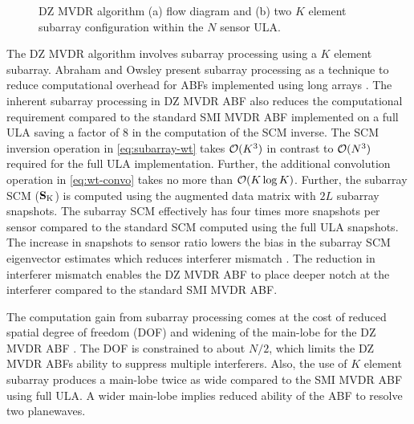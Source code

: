 \begin{figure}[!ht]
  \centering

  \vfil


  \caption{DZ MVDR algorithm (a) flow diagram and (b) two $K$ element
    subarray configuration within the $N$ sensor ULA.}
  \label{fig:dzmvdr}
\end{figure}

The DZ MVDR algorithm involves subarray processing using a $K$ element
subarray. Abraham and Owsley present subarray processing as a
technique to reduce computational overhead for ABFs implemented using
long arrays \cite{abraham89preproc}. The inherent subarray processing
in DZ MVDR ABF also reduces the computational requirement compared to the
standard SMI MVDR ABF implemented on a full ULA saving a factor of 8
in the computation of the SCM inverse. The SCM inversion operation in
\eqref{eq:subarray-wt} takes $\mathcal{O}(K^3)$ in contrast to $\mathcal{O}(N^3)$
required for the full ULA implementation. Further, the additional
convolution operation in \eqref{eq:wt-convo} takes no more than
$\mathcal{O}(K \operatorname{log} K)$. Further, the subarray SCM
(${\bf S}_{\rm K}$) is computed using the augmented data matrix with
$2L$ subarray snapshots. The subarray SCM effectively has four times
more snapshots per sensor compared to the standard SCM computed using
the full ULA snapshots. The increase in snapshots to sensor ratio
lowers the bias in the subarray SCM eigenvector estimates which reduces
interferer mismatch \cite{benaych2011eigen, paul2007asymptotics}. The reduction in interferer mismatch enables the DZ MVDR ABF to place deeper notch at the interferer compared to the standard SMI MVDR ABF. 

The computation gain from subarray processing comes at the cost of
reduced spatial degree of freedom (DOF) and widening of the main-lobe
for the DZ MVDR ABF \cite{abraham89preproc}. The DOF is constrained to
about $N/2$, which limits the DZ MVDR ABFs ability to suppress
multiple interferers. Also, the use of $K$ element subarray produces a
main-lobe twice as wide compared to the SMI MVDR ABF using full ULA. A wider main-lobe implies reduced ability of the ABF to resolve two planewaves.

